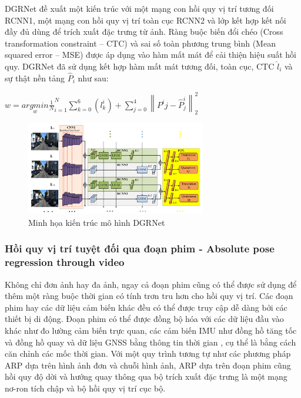 DGRNet \cite{lin2019deep} đề xuất một kiến trúc với một mạng con hồi quy vị trí tương đối RCNN1, một mạng con hồi quy vị trí toàn cục RCNN2 và lớp kết hợp kết nối đầy đủ dùng để trích xuất đặc trưng từ ảnh. Ràng buộc biến đổi chéo (Cross transformation constraint – CTC) và sai số toàn phương trung bình (Mean squared error – MSE) được áp dụng vào hàm mất mát để cải thiện hiệu suất hồi quy. DGRNet đã sử dụng kết hợp hàm mất mát tương đối, toàn cục, CTC $\hat{l}_i$ và sự thật nền tảng $\hat{P}_i$ như sau:
\begin{center}
    $ w = \underset{w}{argmin} \frac{1}{N}^{N}_{i=1} \sum_{k=0}^{6}(l^i_k) + \sum_{j=0}^{4}\left \| P^ij - \hat{P}^i_j \right \|^2_2 $
\end{center}
\begin{figure}[H]
    \centering
    \includegraphics[width=0.7\textwidth]{pics/Chapter2/dgrnet.png}
    \caption{Minh họa kiến trúc mô hình DGRNet \cite{lin2019deep}}
\end{figure}
\subsubsection*{Hồi quy vị trí tuyệt đối qua đoạn phim - Absolute pose regression through video}

Không chỉ đơn ảnh hay đa ảnh, ngay cả đoạn phim cũng có thể được sử dụng để thêm một ràng buộc thời gian có tính trơn tru hơn cho hồi quy vị trí. Các đoạn phim hay các dữ liệu cảm biến khác đều có thể được truy cập dễ dàng bởi các thiết bị di động. Đoạn phim có thể được đồng bộ hóa với các dữ liệu đầu vào khác như đo lường cảm biến trực quan, các cảm biến IMU như đồng hồ tăng tốc và đồng hồ quay và dữ liệu GNSS bằng thông tin thời gian , cụ thể là bằng cách căn chỉnh các mốc thời gian. Với một quy trình tương tự như các phương pháp ARP dựa trên hình ảnh đơn và chuỗi hình ảnh, ARP dựa trên đoạn phim cũng hồi quy độ dời và hướng quay thông qua bộ trích xuất đặc trưng là một mạng nơ-ron tích chập và bộ hồi quy vị trí cục bộ.

